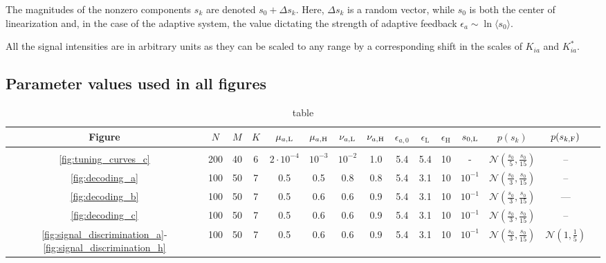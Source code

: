 The magnitudes of the nonzero components $s_k$ are denoted $s_0 + \Delta s_k$. Here, $\Delta s_k$ is a random vector, while $s_0$ is both the center of linearization and, in the case of the adaptive system, the value dictating the strength of adaptive feedback $\epsilon_a\sim\ln\langle s_0 \rangle$. 

All the signal intensities are in arbitrary units as they can be scaled to any range by a corresponding shift in the scales of $K_{ia}$ and $K^*_{ia}$.

\subsection{Parameter values used in all figures}

\begin{table}[!tb]
	\centering
	{\small
	\begin{tabular}{ccccccccccccccc}
		Figure & $N$& $M$ & $K$ & $\mu_{a, \text L}$ & $\mu_{a, \text H}$ & $\nu_{a, \text L}$ & $\nu_{a, \text H}$ & $\epsilon_{a, 0}$ & $\epsilon_{\text {L}}$  & $\epsilon_{\text {H}}$  & $s_{0, \text L}$ & $p(s_k)$ & $p(s_{k, \text F})$\\[0.1cm]

		\hline \\[-0.2cm]
		\smallskip
		
		\ref{fig:tuning_curves_c} & 200 & 40 & 6 & $2\cdot 10^{-4}$ & $10^{-3}$ & $10^{-2}$ & 1.0 & 5.4 & 5.4 & 10  & - & $ \mathcal N\left(\frac{s_0}{5}, \frac{s_0}{15}\right)$ & --\\
		
		\ref{fig:decoding_a} & 100 & 50 & 7 & 0.5 & 0.5 & 0.8 & 0.8 & 5.4 & 3.1 & 10  & $10^{-1}$ & $ \mathcal N\left(\frac{s_0}{3}, \frac{s_0}{15}\right)$ & -- \\
		
		\ref{fig:decoding_b} & 100 & 50 & 7 & 0.5 & 0.6 & 0.6 & 0.9 & 5.4 & 3.1 & 10 & $10^{-1}$ & $ \mathcal N\left(\frac{s_0}{3}, \frac{s_0}{15}\right)$ & ---\\
		
		\ref{fig:decoding_c} & 100 & 50 & 7 & 0.5 & 0.6 & 0.6 & 0.9 & 5.4 & 3.1 & 10 & $10^{-1}$ & $ \mathcal N\left(\frac{s_0}{3}, \frac{s_0}{15}\right)$ & -- \\
	
		\ref{fig:signal_discrimination_a}-\ref{fig:signal_discrimination_h} & 100 & 50 & 7 & 0.5 & 0.6 & 0.6 & 0.9 & 5.4 & 3.1 & 10 & $10^{-1}$ & $ \mathcal N\left(\frac{s_0}{3}, \frac{s_0}{15}\right)$ & $ \mathcal N(1, \frac{1}{5})$ \\
	
	\end{tabular}
	\label{tab:params}
	\caption{table}
}
\end{table}

